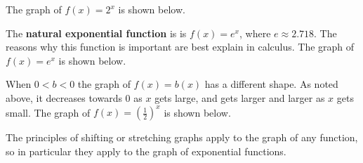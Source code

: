 \documentclass[11pt]{book}               %
\begin{document}
The graph of $f(x) = 2^x$ is shown below.

\begin{center}
\end{center}

The \textbf{natural exponential function} is  is $f(x) = e^x$, where $e \approx 2.718$.  The reasons
why this function is important are best explain in calculus.  The graph of $f(x) = e^x$ is shown below.

\begin{center}
\end{center}
\newpage
When $0 < b < 0$ the graph of $f(x) = b(x)$ has a different shape.  As noted above, it decreases towards 0 
as $x$ gets large, and gets larger and larger as $x$ gets small.    The graph of $f(x) = \left(\frac{1}{2}\right)^x$ is shown below.

\begin{center}
\end{center}

The principles of shifting or stretching graphs apply to the graph of any function, so in particular 
they apply to the graph of exponential functions.
\end{document}
